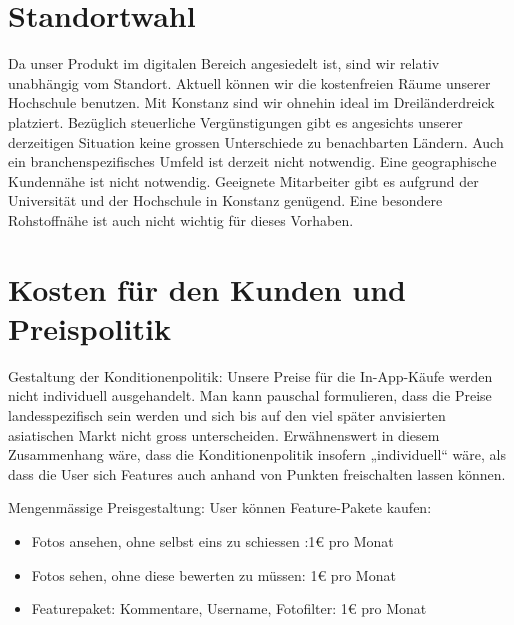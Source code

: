 \section{Standortwahl}
Da unser Produkt im digitalen Bereich angesiedelt ist, sind wir relativ unabhängig vom Standort. Aktuell können wir die kostenfreien Räume unserer Hochschule benutzen. Mit Konstanz sind wir ohnehin ideal im Dreiländerdreick platziert. Bezüglich steuerliche Vergünstigungen gibt es angesichts unserer derzeitigen Situation keine grossen Unterschiede zu benachbarten Ländern. Auch ein branchenspezifisches Umfeld ist derzeit nicht notwendig. Eine geographische Kundennähe ist nicht notwendig. Geeignete Mitarbeiter gibt es aufgrund der Universität und der Hochschule in Konstanz genügend. Eine besondere Rohstoffnähe ist auch nicht wichtig für dieses Vorhaben.



\section{Kosten für den Kunden und Preispolitik}
Gestaltung der Konditionenpolitik: Unsere Preise für die In-App-Käufe werden nicht individuell ausgehandelt. Man kann pauschal formulieren, dass die Preise landesspezifisch sein werden und sich bis auf den viel später anvisierten asiatischen Markt nicht gross unterscheiden.
Erwähnenswert in diesem Zusammenhang wäre, dass die Konditionenpolitik insofern „individuell“ wäre, als dass die User sich Features auch anhand von Punkten freischalten lassen können.

Mengenmässige Preisgestaltung: User können Feature-Pakete kaufen:
\begin{itemize}
\item Fotos ansehen, ohne selbst eins zu schiessen :1€ pro Monat
\item Fotos sehen, ohne diese bewerten zu müssen: 1€ pro Monat
\item Featurepaket: Kommentare, Username, Fotofilter: 1€ pro Monat
\end{itemize}


